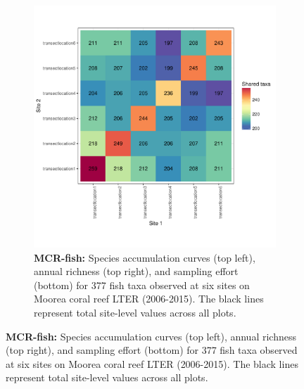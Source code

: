 \documentclass[11pt, oneside]{article}
\begin{document}
\begin{figure}[h!]
\begin{figure}[h!]
\includegraphics[scale = 0.4]{mcr-fish-castorani_spp_shared.pdf}
\caption{{\bf MCR-fish:} Species accumulation curves (top left),  annual richness (top right), and sampling effort (bottom)  for 377 fish taxa observed at six sites on Moorea coral reef LTER (2006-2015). The black lines represent total site-level values across all plots.}
\label{mcr-fish}
\end{figure}



\end{figure}
\end{document}
